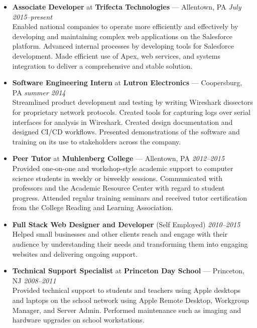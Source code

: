 \documentclass[11pt]{article}
\begin{document}
\begin{itemize}
  \item \textbf{Associate Developer} at \textbf{Trifecta Technologies} --- Allentown, PA \hfill {\em July 2015--present} \\
    Enabled national companies to operate more efficiently and effectively by developing and maintaining complex web applications on the Salesforce platform. Advanced internal processes by developing tools for Salesforce development. Made efficient use of Apex, web services, and systems integration to deliver a comprehensive and stable solution.

  \item \textbf{Software Engineering Intern} at \textbf{Lutron Electronics} --- Coopersburg, PA \hfill {\em summer 2014} \\
    Streamlined product development and testing by writing Wireshark dissectors for proprietary network protocols. Created tools for capturing logs over serial interfaces for analysis in Wireshark. Created design documentation and designed CI/CD workflows. Presented demonstrations of the software and training on its use to stakeholders across the company.

  \item \textbf{Peer Tutor} at \textbf{Muhlenberg College} --- Allentown, PA \hfill {\em 2012--2015} \\
    Provided one-on-one and workshop-style academic support to computer science students in weekly or biweekly sessions. Communicated with professors and the Academic Resource Center with regard to student progress. Attended regular training seminars and received tutor certification from the College Reading and Learning Association.

  \item \textbf{Full Stack Web Designer and Developer} (Self Employed) \hfill {\em 2010--2015} \\
    Helped small businesses and other clients reach and engage with their audience by understanding their needs and transforming them into engaging websites and delivering ongoing support.

  \item \textbf{Technical Support Specialist} at \textbf{Princeton Day School} --- Princeton, NJ \hfill {\em 2008--2011} \\
    Provided technical support to students and teachers using Apple desktops and laptops on the school network using Apple Remote Desktop, Workgroup Manager, and Server Admin. Performed maintenance such as imaging and hardware upgrades on school workstations.
\end{itemize}
\end{document}
